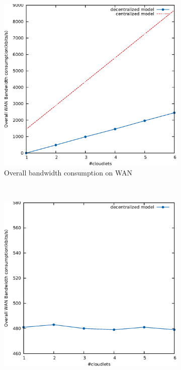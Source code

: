 \documentclass[letterpaper,twocolumn,10pt]{article}
\begin{document}
\begin{figure}[t]
        \centering
        \begin{subfigure}[t]{0.3\textwidth}
                \includegraphics[width=\textwidth]{pic/overallBandwidth.eps}
                \caption{Overall bandwidth consumption on WAN}
                \label{fig:sinOverallBand}
        \end{subfigure}%
        ~ %
        \begin{subfigure}[t]{0.3\textwidth}
                \includegraphics[width=\textwidth]{pic/perServerBandwidth.eps}

\end{subfigure}
\end{figure}
\end{document}
